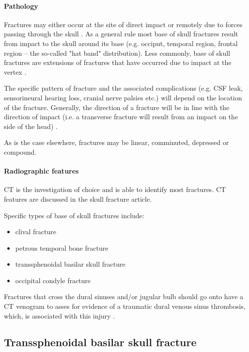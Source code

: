 \paragraph{Pathology}

Fractures may either occur at the site of direct impact or remotely due to forces passing through the skull . As a general rule most base of skull fractures result from impact to the skull around its base (e.g. occiput, temporal region, frontal region -- the so-called "hat band" distribution). Less commonly, base of skull fractures are extensions of fractures that have occurred due to impact at the vertex .

The specific pattern of fracture and the associated complications (e.g. CSF leak, sensorineural hearing loss, cranial nerve palsies etc.) will depend on the location of the fracture. Generally, the direction of a fracture will be in line with the direction of impact (i.e. a transverse fracture will result from an impact on the side of the head) .

As is the case elsewhere, fractures may be linear, comminuted, depressed or compound.


\paragraph{Radiographic features}

CT is the investigation of choice and is able to identify most fractures. CT features are discussed in the skull fracture article.

Specific types of base of skull fractures include:

\begin{itemize}
	\item
	clival fracture
	\item
	petrous temporal bone fracture
	\item
	transsphenoidal basilar skull fracture
	\item
	occipital condyle fracture
\end{itemize}

Fractures that cross the dural sinuses and/or jugular bulb should go onto have a CT venogram to asses for evidence of a traumatic dural venous sinus thrombosis, which, is associated with this injury .

\subsection{Transsphenoidal basilar skull fracture}

